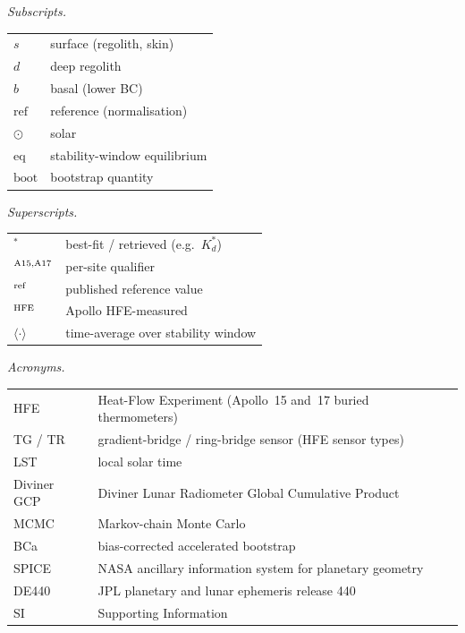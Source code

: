 \documentclass[11pt]{article}
\begin{document}
{\medskip
\begin{minipage}[t]{0.49\linewidth}
\textit{Subscripts.}\par\smallskip
\begin{tabular}{@{}ll@{}}
\toprule
$s$            & surface (regolith, skin) \\
$d$            & deep regolith \\
$b$            & basal (lower BC) \\
$\mathrm{ref}$ & reference (normalisation) \\
$\odot$        & solar \\
$\mathrm{eq}$  & stability-window equilibrium \\
$\mathrm{boot}$ & bootstrap quantity \\
\bottomrule
\end{tabular}
\end{minipage}\hfill
\begin{minipage}[t]{0.49\linewidth}
\textit{Superscripts.}\par\smallskip
\begin{tabular}{@{}ll@{}}
\toprule
$^{*}$            & best-fit / retrieved (e.g.\ $K_d^{*}$) \\
$^{\rm A15,A17}$  & per-site qualifier \\
$^{\rm ref}$      & published reference value \\
$^{\rm HFE}$      & Apollo HFE-measured \\
$\langle\cdot\rangle$ & time-average over stability window \\
\bottomrule
\end{tabular}
\end{minipage}

\medskip
\noindent\textit{Acronyms.}\par\smallskip\noindent
\begin{tabular}{@{}ll@{}}
\toprule
HFE          & Heat-Flow Experiment (Apollo~15 and~17 buried thermometers) \\
TG / TR      & gradient-bridge / ring-bridge sensor (HFE sensor types) \\
LST          & local solar time \\
Diviner GCP  & Diviner Lunar Radiometer Global Cumulative Product \\
MCMC         & Markov-chain Monte Carlo \\
BCa          & bias-corrected accelerated bootstrap \\
SPICE        & NASA ancillary information system for planetary geometry \\
DE440        & JPL planetary and lunar ephemeris release 440 \\
SI           & Supporting Information \\
\bottomrule
\end{tabular}
}


\end{document}
